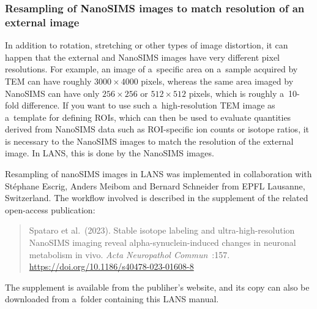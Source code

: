 

\subsubsection{Resampling of NanoSIMS images to match resolution of an external image}
\setcounter{step}{0}

\goldbox{}
In addition to rotation, stretching or other types of image distortion, it can happen that the external and NanoSIMS images have very different pixel resolutions. For example, an image of a~specific area on a~sample acquired by TEM can have roughly $3000\times 4000$ pixels, whereas the same area imaged by NanoSIMS can have only $256\times 256$ or $512\times 512$ pixels, which is roughly a~10-fold difference. If you want to use such a~high-resolution TEM image as a~template for defining ROIs, which can then be used to evaluate quantities derived from NanoSIMS data such as ROI-specific ion counts or isotope ratios, it is necessary to  the NanoSIMS images to match the resolution of the external image. In LANS, this is done by  the NanoSIMS images.
\tcbe

\noindent
Resampling of nanoSIMS images in LANS was implemented in collaboration with St\'ephane Escrig, Anders Meibom and Bernard Schneider from EPFL Lausanne, Switzerland. The workflow involved is described in the supplement of the related open-access publication:
\begin{quote}
\textsf{Spataro et al.~(2023). Stable isotope labeling and ultra-high-resolution NanoSIMS imaging reveal alpha-synuclein-induced changes in neuronal metabolism in vivo. \emph{Acta Neuro\-pathol Commun}~:157. \url{https://doi.org/10.1186/s40478-023-01608-8}}
\end{quote}
The supplement is available from the publiher's website, and its copy can also be downloaded from a~folder containing this LANS manual.